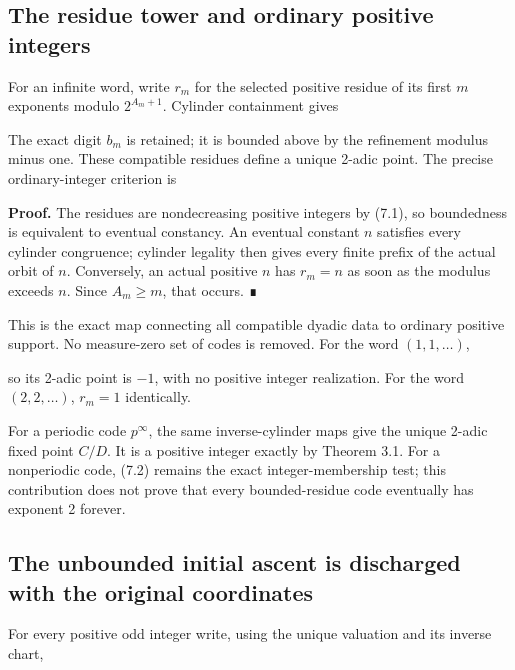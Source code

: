 \subsection{The residue tower and ordinary positive integers}

For an infinite word, write \(r_m\) for the selected positive residue of
its first \(m\) exponents modulo \(2^{A_m+1}\). Cylinder containment
gives


The exact digit \(b_m\) is retained; it is bounded above by the
refinement modulus minus one. These compatible residues define a unique
2-adic point. The precise ordinary-integer criterion is


\textbf{Proof.} The residues are nondecreasing positive integers by
(7.1), so boundedness is equivalent to eventual constancy. An eventual
constant \(n\) satisfies every cylinder congruence; cylinder legality
then gives every finite prefix of the actual orbit of \(n\). Conversely,
an actual positive \(n\) has \(r_m=n\) as soon as the modulus exceeds
\(n\). Since \(A_m\ge m\), that occurs. ∎

This is the exact map connecting all compatible dyadic data to ordinary
positive support. No measure-zero set of codes is removed. For the word
\((1,1,\ldots)\),


so its 2-adic point is \(-1\), with no positive integer realization. For
the word \((2,2,\ldots)\), \(r_m=1\) identically.

For a periodic code \(p^\infty\), the same inverse-cylinder maps give
the unique 2-adic fixed point \(C/D\). It is a positive integer exactly
by Theorem 3.1. For a nonperiodic code, (7.2) remains the exact
integer-membership test; this contribution does not prove that every
bounded-residue code eventually has exponent 2 forever.

\subsection{The unbounded initial ascent is discharged with the original
coordinates}

For every positive odd integer write, using the unique valuation and its
inverse chart,

